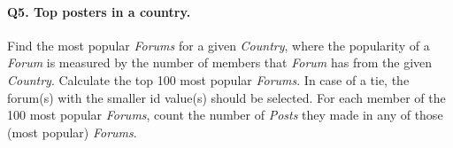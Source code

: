 \paragraph{\textbf{Q5}. Top posters in a country.}
Find the most popular \emph{Forums} for a given \emph{Country}, where
the popularity of a \emph{Forum} is measured by the number of members
that \emph{Forum} has from the given \emph{Country}.
Calculate the top 100 most popular \emph{Forums}. In case of a tie, the
forum(s) with the smaller id value(s) should be selected.
For each member of the 100 most popular \emph{Forums}, count the number
of \emph{Posts} they made in any of those (most popular) \emph{Forums}.
